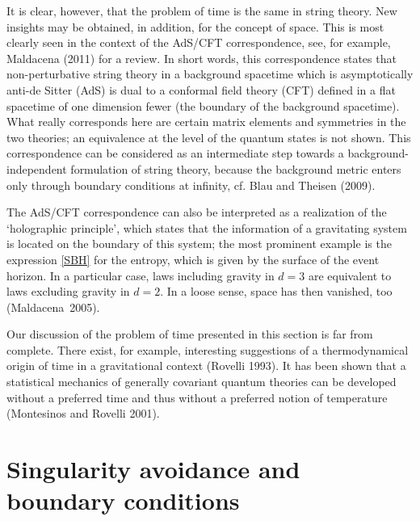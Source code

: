 \documentclass[12pt]{article}
\begin{document}
It is clear, however, that the problem of time is the same in string
theory. New insights may be obtained, in addition, for the concept of
space. This 
is most clearly seen in the context of the AdS/CFT correspondence,
see, for example, Maldacena (2011) for a review. 
In short words, this correspondence states that 
non-perturbative string theory in
  a background spacetime which is asymptotically anti-de Sitter (AdS)
  is dual to a conformal field theory (CFT) defined in a flat
  spacetime of one dimension fewer (the boundary of the background
  spacetime). What really corresponds here are certain matrix elements
  and symmetries in the two theories; an equivalence at the level of
  the quantum states is not shown.
This correspondence can be considered as an intermediate step towards
a background-independent formulation of 
string theory, because the background metric enters only through boundary
conditions at infinity, cf. Blau and Theisen (2009). 

The AdS/CFT correspondence can also be interpreted as a 
realization of the `holographic principle', which states that the
information of a gravitating system is located on the boundary of this
system; the most prominent example is the expression \eqref{SBH} for
the entropy, which is given by the surface of the event horizon. In a
particular case, 
laws including gravity in $d=3$ are equivalent to laws
excluding gravity in $d=2$.
In a loose sense, space has then vanished, too (Maldacena~2005). 

Our discussion of the problem of time presented in this section is far
from complete. There exist, for example, interesting suggestions of a
thermodynamical origin of time in a gravitational context (Rovelli
1993). It has been shown that a statistical mechanics of generally
covariant quantum theories can be developed without a preferred time
and thus without a preferred notion of temperature (Montesinos and
Rovelli 2001).  


\section{Singularity avoidance and boundary conditions}
\end{document}
